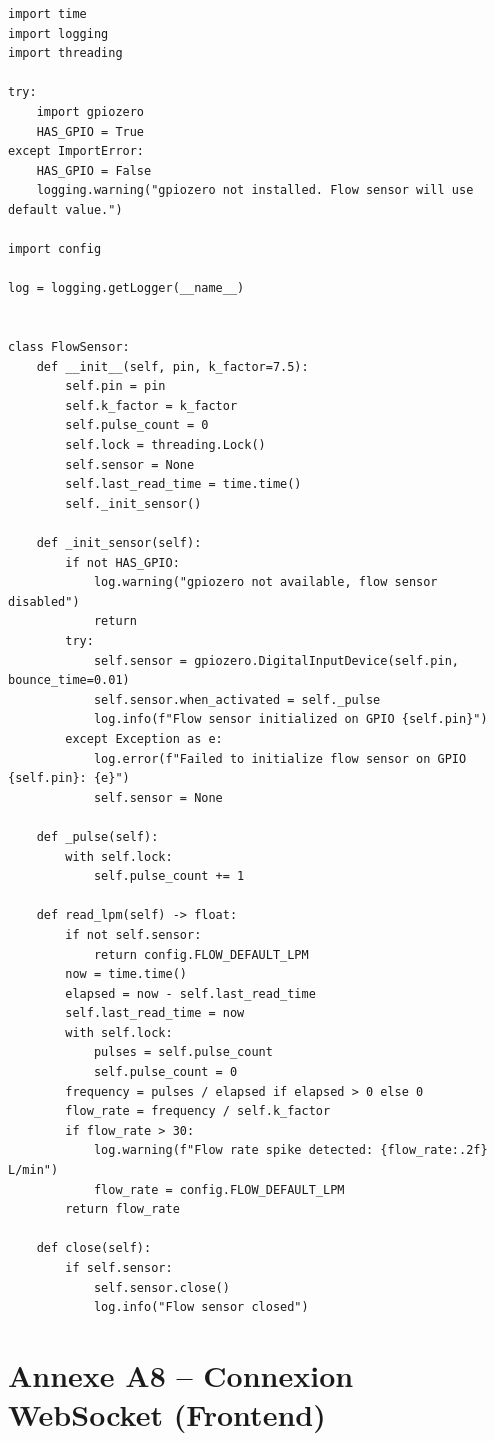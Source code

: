 \begin{lstlisting}
import time
import logging
import threading

try:
    import gpiozero
    HAS_GPIO = True
except ImportError:
    HAS_GPIO = False
    logging.warning("gpiozero not installed. Flow sensor will use default value.")

import config

log = logging.getLogger(__name__)


class FlowSensor:
    def __init__(self, pin, k_factor=7.5):
        self.pin = pin
        self.k_factor = k_factor
        self.pulse_count = 0
        self.lock = threading.Lock()
        self.sensor = None
        self.last_read_time = time.time()
        self._init_sensor()

    def _init_sensor(self):
        if not HAS_GPIO:
            log.warning("gpiozero not available, flow sensor disabled")
            return
        try:
            self.sensor = gpiozero.DigitalInputDevice(self.pin, bounce_time=0.01)
            self.sensor.when_activated = self._pulse
            log.info(f"Flow sensor initialized on GPIO {self.pin}")
        except Exception as e:
            log.error(f"Failed to initialize flow sensor on GPIO {self.pin}: {e}")
            self.sensor = None

    def _pulse(self):
        with self.lock:
            self.pulse_count += 1

    def read_lpm(self) -> float:
        if not self.sensor:
            return config.FLOW_DEFAULT_LPM
        now = time.time()
        elapsed = now - self.last_read_time
        self.last_read_time = now
        with self.lock:
            pulses = self.pulse_count
            self.pulse_count = 0
        frequency = pulses / elapsed if elapsed > 0 else 0
        flow_rate = frequency / self.k_factor
        if flow_rate > 30:
            log.warning(f"Flow rate spike detected: {flow_rate:.2f} L/min")
            flow_rate = config.FLOW_DEFAULT_LPM
        return flow_rate

    def close(self):
        if self.sensor:
            self.sensor.close()
            log.info("Flow sensor closed")
\end{lstlisting}

\section{Annexe A8 -- Connexion WebSocket (Frontend)}
\label{annexe:websocket}

